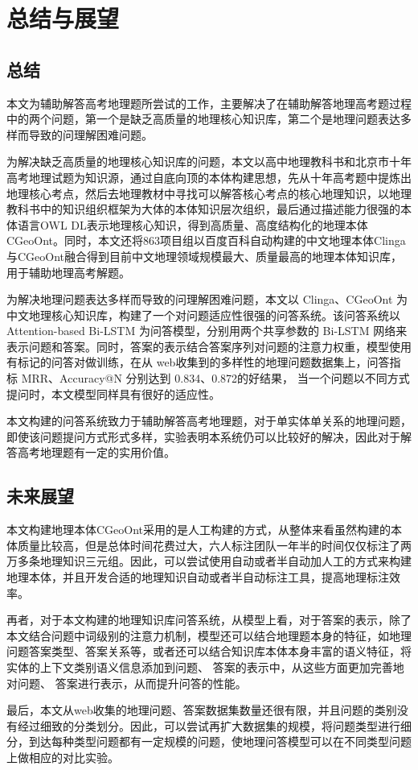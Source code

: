 \chapter{总结与展望}
\section{总结}
本文为辅助解答高考地理题所尝试的工作，主要解决了在辅助解答地理高考题过程中的两个问题，第一个是缺乏高质量的地理核心知识库，第二个是地理问题表达多样而导致的问理解困难问题。

为解决缺乏高质量的地理核心知识库的问题，本文以高中地理教科书和北京市十年高考地理试题为知识源，通过自底向顶的本体构建思想，先从十年高考题中提炼出地理核心考点，然后去地理教材中寻找可以解答核心考点的核心地理知识，以地理教科书中的知识组织框架为大体的本体知识层次组织，最后通过描述能力很强的本体语言OWL DL表示地理核心知识，得到高质量、高度结构化的地理本体CGeoOnt。同时，本文还将863项目组以百度百科自动构建的中文地理本体Clinga与CGeoOnt融合得到目前中文地理领域规模最大、质量最高的地理本体知识库，用于辅助地理高考解题。

为解决地理问题表达多样而导致的问理解困难问题，本文以 Clinga、CGeoOnt 为中文地理核心知识库，构建了一个对问题适应性很强的问答系统。该问答系统以 Attention-based Bi-LSTM 为问答模型，分别用两个共享参数的 Bi-LSTM 网络来表示问题和答案。同时，答案的表示结合答案序列对问题的注意力权重，模型使用有标记的问答对做训练，在从 web收集到的多样性的地理问题数据集上，问答指标 MRR、Accuracy@N 分别达到 0.834、0.872的好结果， 当一个问题以不同方式提问时，本文模型同样具有很好的适应性。

本文构建的问答系统致力于辅助解答高考地理题，对于单实体单关系的地理问题，即使该问题提问方式形式多样，实验表明本系统仍可以比较好的解决，因此对于解答高考地理题有一定的实用价值。

\section{未来展望}
本文构建地理本体CGeoOnt采用的是人工构建的方式，从整体来看虽然构建的本体质量比较高，但是总体时间花费过大，六人标注团队一年半的时间仅仅标注了两万多条地理知识三元组。因此，可以尝试使用自动或者半自动加人工的方式来构建地理本体，并且开发合适的地理知识自动或者半自动标注工具，提高地理标注效率。

再者，对于本文构建的地理知识库问答系统，从模型上看，对于答案的表示，除了本文结合问题中词级别的注意力机制，模型还可以结合地理题本身的特征，如地理问题答案类型、答案关系等，或者还可以结合知识库本体本身丰富的语义特征，将实体的上下文类别语义信息添加到问题、 答案的表示中，从这些方面更加完善地对问题、 答案进行表示，从而提升问答的性能。

最后，本文从web收集的地理问题、答案数据集数量还很有限，并且问题的类别没有经过细致的分类划分。因此，可以尝试再扩大数据集的规模，将问题类型进行细分，到达每种类型问题都有一定规模的问题，使地理问答模型可以在不同类型问题上做相应的对比实验。
